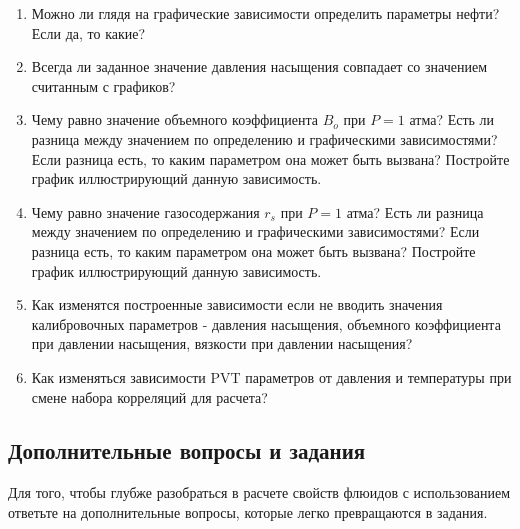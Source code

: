 \begin{enumerate}
	
	\item Можно ли глядя на графические зависимости определить параметры нефти? Если да, то какие?
	
	\item Всегда ли заданное значение давления насыщения совпадает со значением считанным с графиков?
	
	\item Чему равно значение объемного коэффициента $B_o$ при $P = 1$ атма? Есть ли разница между значением по определению и графическими зависимостями? Если разница есть, то каким параметром она может быть вызвана? Постройте график иллюстрирующий данную зависимость.
	
	\item Чему равно значение газосодержания $r_s$ при $P = 1$ атма? Есть ли разница между значением по определению и графическими зависимостями? Если разница есть, то каким параметром она может быть вызвана? Постройте график иллюстрирующий данную зависимость.
	
 	\item Как изменятся построенные зависимости если не вводить значения калибровочных параметров - давления насыщения, объемного коэффициента при давлении насыщения, вязкости при давлении насыщения?
	
	\item 	Как изменяться зависимости PVT параметров от давления и температуры при смене набора корреляций для расчета?
	
\end{enumerate}

\subsection{Дополнительные вопросы и задания}

	Для того, чтобы глубже разобраться в расчете свойств флюидов с использованием \unf{} ответьте на дополнительные вопросы, которые легко превращаются в задания.

